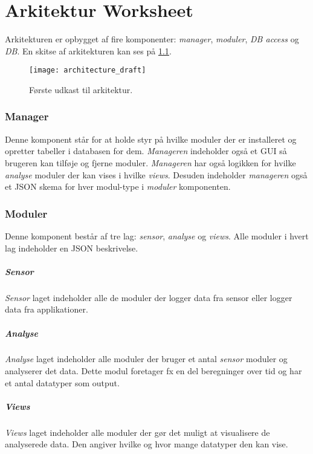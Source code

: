 \chapter{Arkitektur Worksheet}
Arkitekturen er opbygget af fire komponenter: \textit{manager}, \textit{moduler}, \textit{DB access} og \textit{DB}.
En skitse af arkitekturen kan ses på \cref{arkitektur_udkast_1}.
\begin{figure}[h]
	\texttt{[image: architecture\_draft]}
	\label{arkitektur_udkast_1}
	\caption{Første udkast til arkitektur.}
\end{figure}

\subsection*{Manager}
Denne komponent står for at holde styr på hvilke moduler der er installeret og opretter tabeller i databasen for dem.
\textit{Manageren} indeholder også et GUI så brugeren kan tilføje og fjerne moduler.
\textit{Manageren} har også logikken for hvilke \textit{analyse} moduler der kan vises i hvilke \textit{views}.
Desuden indeholder \textit{manageren} også et JSON skema for hver modul-type i \textit{moduler} komponenten.

\subsection*{Moduler}
Denne komponent består af tre lag: \textit{sensor}, \textit{analyse} og \textit{views}.
Alle moduler i hvert lag indeholder en JSON beskrivelse.

\paragraph{Sensor}
\textit{Sensor} laget indeholder alle de moduler der logger data fra sensor eller logger data fra applikationer.

\paragraph{Analyse}
\textit{Analyse} laget indeholder alle moduler der bruger et antal \textit{sensor} moduler og analyserer det data.
Dette modul foretager fx en del beregninger over tid og har et antal datatyper som output.

\paragraph{Views}
\textit{Views} laget indeholder alle moduler der gør det muligt at visualisere de analyserede data.
Den angiver hvilke og hvor mange datatyper den kan vise.

